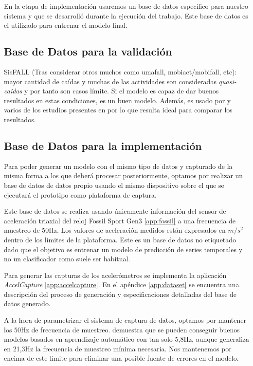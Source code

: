\documentclass[../tfm.tex]{subfiles}
\begin{document}
En la etapa de implementación usaremos un base de datos específico para nuestro sistema y que se desarrolló durante la ejecución del trabajo. Este base de datos es el utilizado para entrenar el modelo final.

\subsection{Base de Datos para la validación}
SisFALL (Tras considerar otros muchos como umafall, mobiact/mobifall, etc): mayor cantidad de caídas y muchas de las actividades son consideradas \textit{quasi-caidas} y por tanto son casos límite. Si el modelo es capaz de dar buenos resultados en estas condiciones, es un buen modelo. Además, es usado por \cite{Musci2020} y varios de los estudios presentes en \cite{Anita2020} por lo que resulta ideal para comparar los resultados.

\subsection{Base de Datos para la implementación}

Para poder generar un modelo con el mismo tipo de datos y capturado de la misma forma a los que deberá procesar posteriormente, optamos por realizar un base de datos de datos propio usando el mismo dispositivo sobre el que se ejecutará el prototipo como plataforma de captura.

Este base de datos se realiza usando únicamente información del sensor de aceleración triaxial del reloj Fossil Sport Gen3 \ref{app:fossil} a una frecuencia de muestreo de 50Hz. Los valores de aceleración medidos están expresados en $m/s^2$ dentro de los límites de la plataforma. Este es un base de datos no etiquetado dado que el objetivo es entrenar un modelo de predicción de series temporales y no un clasificador como suele ser habitual.

Para generar las capturas de los acelerómetros se implementa la aplicación \textit{AccelCapture} \ref{app:accelcapture}. En el apéndice \ref{app:dataset} se encuentra una descripción del proceso de generación y especificaciones detalladas del base de datos generado.

A la hora de parametrizar el sistema de captura de datos, optamos por mantener los 50Hz de frecuencia de muestreo. \cite{Liu2018} demuestra que se pueden conseguir buenos modelos basados en aprendizaje automático con tan solo 5,8Hz, aunque generaliza en 21,3Hz la frecuencia de muestreo mínima necesaria. Nos mantenemos por encima de este límite para eliminar una posible fuente de errores en el modelo.
\end{document}
